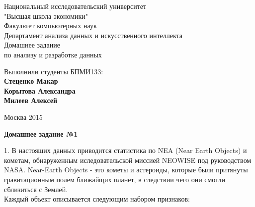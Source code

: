 \documentclass{article}
\begin{document}
\begin{titlepage}  

\begin{center}  

\large Национальный исследовательский университет \\"Высшая школа экономики"\\[0.5cm]

\large Факультет компьютерных наук\\

\large Департамент анализа данных и искусственного интеллекта\\[4cm]

\huge Домашнее задание\\
\large по анализу и разработке данных\\[4cm]

\end{center}

\begin{flushleft}
\large Выполнили студенты БПМИ133:\\
\large \bf{Стеценко Макар}\\
\large \bf{Корытова Александра}\\
\large \bf{Милеев Алексей}\\[5cm]
\end{flushleft}

\begin{center}
\large Москва 2015
\end{center}

\end{titlepage}

\newpage


\large \textbf{Домашнее задание №1}

1. В настоящих данных приводится статистика по NEA (Near Earth Objects) и кометам, обнаруженным иследовательской миссией NEOWISE под руководством NASA. Near-Earth Objects - это кометы и астероиды, которые были притянуты гравитационным полем ближайщих планет, в следствии чего они смогли сблизиться с Землей. \\[0.3cm]



Каждый объект описывается следующим набором признаков:
\end{document}
